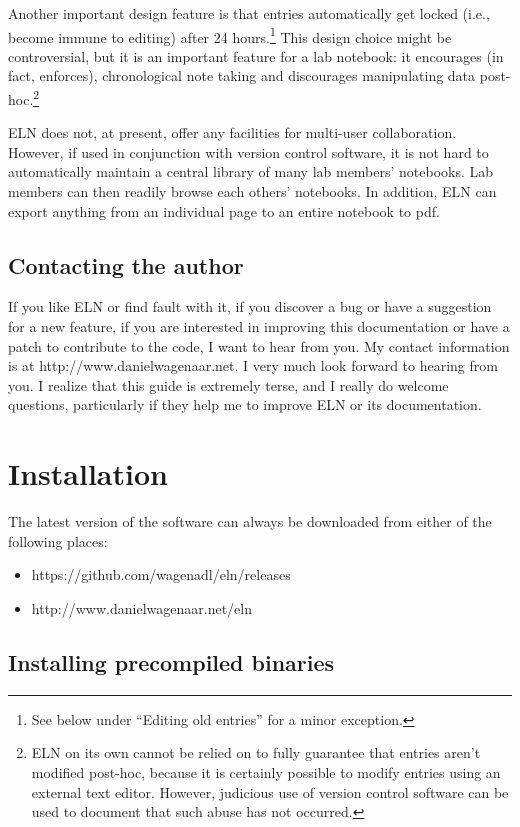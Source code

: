\documentclass[11pt]{report}
\begin{document}
Another important design feature is that entries automatically get
locked (i.e., become immune to editing) after 24 hours.\footnote{See
  below under ``Editing old entries'' for a minor exception.} This
design choice might be controversial, but it is an important feature
for a lab notebook: it encourages (in fact, enforces), chronological
note taking and discourages manipulating data post-hoc.\footnote{ELN
  on its own cannot be relied on to fully guarantee that entries
  aren't modified post-hoc, because it is certainly possible to modify
  entries using an external text editor. However, judicious use of
  version control software can be used to document that such abuse has
  not occurred.}

ELN does not, at present, offer any facilities for multi-user
collaboration. However, if used in conjunction with version control
software, it is not hard to automatically maintain a central library of
many lab members' notebooks. Lab members can then readily browse each
others' notebooks. In addition, ELN can export anything from an
individual page to an entire notebook to pdf.

\section{Contacting the author}

If you like ELN or find fault with it, if you discover a bug or have a
suggestion for a new feature, if you are interested in improving this
documentation or have a patch to contribute to the code, I want to
hear from you. My contact information is at
http://www.danielwagenaar.net. I very much look forward to hearing
from you. I realize that this guide is extremely terse, and I
really do welcome questions, particularly if they help me to improve
ELN or its documentation.


\chapter{Installation}

The latest version of the software can always be downloaded from
either of the following places:
\begin{itemize}
\item https://github.com/wagenadl/eln/releases
  \item http://www.danielwagenaar.net/eln
\end{itemize}

\section{Installing precompiled binaries}
\end{document}
